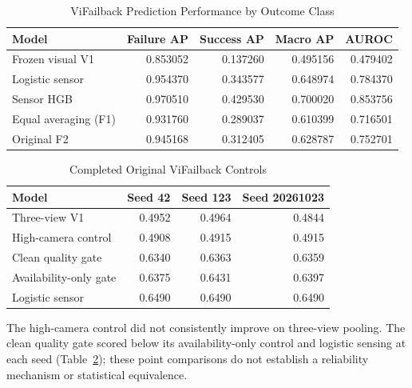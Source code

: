 \begin{table}[htbp]
\caption{ViFailback Prediction Performance by Outcome Class}\label{tab:vif-bothclass}
\centering\small

\begin{tabular}{lrrrr}\hline Model&Failure AP&Success AP&Macro AP&AUROC\\\hline
Frozen visual V1&0.853052&0.137260&0.495156&0.479402\\
Logistic sensor&0.954370&0.343577&0.648974&0.784370\\
Sensor HGB&0.970510&0.429530&0.700020&0.853756\\
Equal averaging (F1)&0.931760&0.289037&0.610399&0.716501\\
Original F2&0.945168&0.312405&0.628787&0.752701\\\hline
\end{tabular}
\end{table}

\begin{table}[htbp]
\caption{Completed Original ViFailback Controls}\label{tab:vif-controls}
\centering\small
\begin{tabular}{lrrr}\toprule
Model & Seed 42 & Seed 123 & Seed 20261023\\\midrule
Three-view V1 & 0.4952 & 0.4964 & 0.4844\\
High-camera control & 0.4908 & 0.4915 & 0.4915\\
Clean quality gate & 0.6340 & 0.6363 & 0.6359\\
Availability-only gate & 0.6375 & 0.6431 & 0.6397\\
Logistic sensor & 0.6490 & 0.6490 & 0.6490\\
\bottomrule\end{tabular}
\end{table}
The high-camera control did not consistently improve on three-view pooling. The clean
quality gate scored below its availability-only control and logistic sensing at each
seed (Table~\ref{tab:vif-controls}); these point comparisons do not establish a
reliability mechanism or statistical equivalence.

